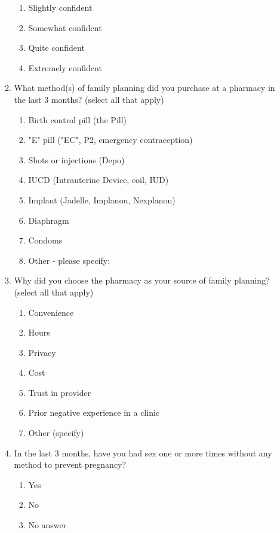 \begin{enumerate}
\begin{enumerate}
\begin{enumerate}
            \item Slightly confident
            \item Somewhat confident
            \item Quite confident
            \item Extremely confident
        \end{enumerate}
        \item What method(s) of family planning did you purchase at a pharmacy in the last 3 months? (select all that apply)
        \begin{enumerate}
            \item Birth control pill (the Pill)
            \item "E" pill ("EC", P2, emergency contraception)
            \item Shots or injections (Depo)
            \item IUCD (Intrauterine Device, coil, IUD)
            \item Implant (Jadelle, Implanon, Nexplanon)
            \item Diaphragm
            \item Condoms
            \item Other - please specify:
        \end{enumerate}
        \item Why did you choose the pharmacy as your source of family planning? (select all that apply)
        \begin{enumerate}
            \item Convenience
            \item Hours
            \item Privacy
            \item Cost
            \item Trust in provider
            \item Prior negative experience in a clinic
            \item Other (specify)
        \end{enumerate}
        \item In the last 3 months, have you had sex one or more times without any method to prevent pregnancy?
            \begin{enumerate}
                \item Yes
                \item No
                \item No answer
            \end{enumerate}  

\end{enumerate}
\end{enumerate}
